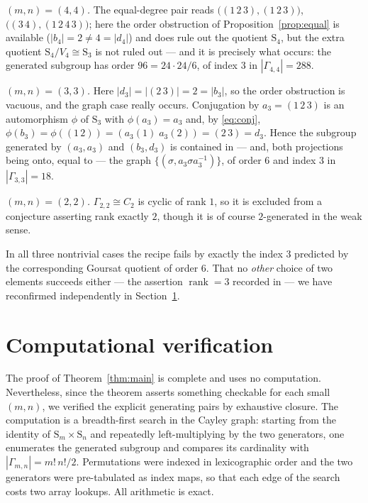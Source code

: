 \documentclass[11pt]{article}
\theoremstyle{plain}
\theoremstyle{definition}
\theoremstyle{remark}
\numberwithin{equation}{section}
\newcommand{\Sym}{\mathrm{S}}
\newcommand{\Gam}{\Gamma}
\DeclareMathOperator{\rank}{rank}
\begin{document}
\emph{$(m,n) = (4,4)$.} The equal-degree pair reads $\bigl((1\,2\,3),(1\,2\,3)\bigr)$,
$\bigl((3\,4),(1\,2\,4\,3)\bigr)$; here the order obstruction of Proposition~\ref{prop:equal} is
available ($|b_4| = 2 \ne 4 = |d_4|$) and does rule out the quotient $\Sym_4$, but the extra
quotient $\Sym_4/V_4\cong\Sym_3$ is not ruled out --- and it is precisely what occurs: the
generated subgroup has order $96 = 24\cdot 24/6$, of index $3$ in $|\Gam_{4,4}| = 288$.

\emph{$(m,n) = (3,3)$.} Here $|d_3| = |(2\,3)| = 2 = |b_3|$, so the order obstruction is vacuous,
and the graph case really occurs. Conjugation by $a_3 = (1\,2\,3)$ is an automorphism $\phi$ of
$\Sym_3$ with $\phi(a_3) = a_3$ and, by \eqref{eq:conj},
$\phi(b_3) = \phi((1\,2)) = (a_3(1)\;a_3(2)) = (2\,3) = d_3$. Hence the subgroup generated by
$(a_3,a_3)$ and $(b_3,d_3)$ is contained in --- and, both projections being onto, equal to --- the
graph $\{(\sigma, a_3\sigma a_3^{-1})\}$, of order $6$ and index $3$ in $|\Gam_{3,3}| = 18$.

\emph{$(m,n) = (2,2)$.} $\Gam_{2,2} \cong C_2$ is cyclic of rank $1$, so it is excluded from a
conjecture asserting rank exactly $2$, though it is of course $2$-generated in the weak sense.

In all three nontrivial cases the recipe fails by exactly the index $3$ predicted by the
corresponding Goursat quotient of order $6$. That no \emph{other} choice of two elements
succeeds either --- the assertion $\rank = 3$ recorded in \cite{fernandes} --- we have
reconfirmed independently in Section~\ref{sec:comp}.

\section{Computational verification}
\label{sec:comp}

The proof of Theorem~\ref{thm:main} is complete and uses no computation. Nevertheless, since the
theorem asserts something checkable for each small $(m,n)$, we verified the explicit generating
pairs by exhaustive closure. The computation is a breadth-first search in the Cayley graph:
starting from the identity of $\Sym_m\times\Sym_n$ and repeatedly left-multiplying by the two
generators, one enumerates the generated subgroup and compares its cardinality with
$|\Gam_{m,n}| = m!\,n!/2$. Permutations were indexed in lexicographic order and the two
generators were pre-tabulated as index maps, so that each edge of the search costs two array
lookups. All arithmetic is exact.
\end{document}
